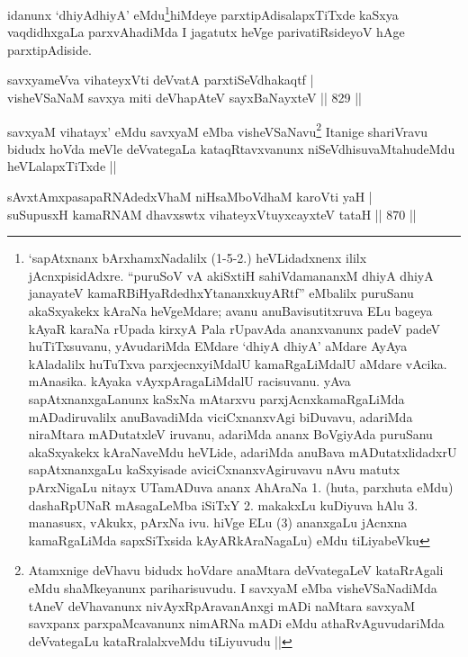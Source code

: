 \begin{artha}
idanunx `dhiyAdhiyA' eMdu\footnote{`sapAtxnanx bArxhamxNadalilx (1-5-2.) heVLidadxnenx ililx jAcnxpisidAdxre. ``puruSoV vA akiSxtiH sahiVdamananxM dhiyA dhiyA janayateV kamaRBiHyaRdedhxYtananxkuyARtf'' eMbalilx puruSanu akaSxyakekx kAraNa heVgeMdare; avanu anuBavisutitxruva ELu bageya kAyaR karaNa rUpada kirxyA Pala rUpavAda ananxvanunx padeV padeV huTiTxsuvanu, yAvudariMda EMdare `dhiyA dhiyA' aMdare AyAya kAladalilx huTuTxva parxjecnxyiMdalU kamaRgaLiMdalU aMdare vAcika. mAnasika. kAyaka vAyxpAragaLiMdalU racisuvanu. yAva sapAtxnanxgaLanunx kaSxNa mAtarxvu parxjAcnxkamaRgaLiMda mADadiruvalilx anuBavadiMda viciCxnanxvAgi biDuvavu, adariMda niraMtara mADutatxleV iruvanu, adariMda ananx BoVgiyAda puruSanu akaSxyakekx kAraNaveMdu heVLide, adariMda anuBava mADutatxlidadxrU sapAtxnanxgaLu kaSxyisade aviciCxnanxvAgiruvavu nAvu matutx pArxNigaLu nitayx UTamADuva ananx AhAraNa 1. (huta, parxhuta eMdu) dashaRpUNaR mAsagaLeMba iSiTxY 2. makakxLu kuDiyuva hAlu 3. manasusx, vAkukx, pArxNa ivu. hiVge ELu (3) ananxgaLu jAcnxna kamaRgaLiMda sapxSiTxsida kAyARkAraNagaLu) eMdu tiLiyabeVku}hiMdeye parxtipAdisalapxTiTxde kaSxya vaqdidhxgaLa parxvAhadiMda I jagatutx heVge parivatiRsideyoV hAge parxtipAdiside.
\end{artha}

\begin{shl}
savxyameVva vihateyxVti deVvatA parxtiSeVdhakaqtf |\\
visheVSaNaM savxya miti deVhapAteV \s sayxBaNayxteV \hfill|| 829 ||
\end{shl}



\begin{artha}
savxyaM vihatayx' eMdu savxyaM eMba visheVSaNavu\footnote{Atamxnige deVhavu bidudx hoVdare anaMtara deVvategaLeV kataRrAgali eMdu shaMkeyanunx pariharisuvudu. I savxyaM eMba visheVSaNadiMda tAneV deVhavanunx nivAyxRpAravanAnxgi mADi naMtara savxyaM savxpanx parxpaMcavanunx nimARNa mADi eMdu athaRvAguvudariMda deVvategaLu kataRralalxveMdu tiLiyuvudu ||} Itanige shariVravu bidudx hoVda meVle deVvategaLa kataqRtavxvanunx niSeVdhisuvaMtahudeMdu heVLalapxTiTxde ||
\end{artha}


\begin{shl}
sAvxtAmxpasapaRNAdedxVhaM niHsaMboVdhaM karoVti yaH | \\
suSupusxH kamaRNAM dhavxswtx vihateyxVtuyxcayxteV tataH \hfill||  870 ||  
\end{shl}

